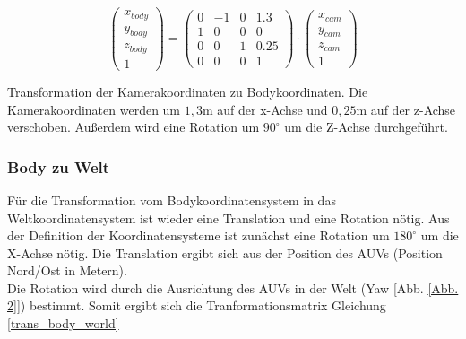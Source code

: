 \begin{ownequation}[H]
\begin{equation}
\begin{pmatrix}
x_{body}\\y_{body}\\z_{body}\\1
\end{pmatrix}
=
\begin{pmatrix}
0 & -1 & 0& 1.3\\
1 & 0 & 0& 0\\
0 & 0 & 1& 0.25\\
0 & 0 & 0 & 1
\end{pmatrix}
\cdot
\begin{pmatrix}
x_{cam}\\y_{cam}\\z_{cam}\\1
\end{pmatrix}
\end{equation}
\caption[Transformation der Kamerakoordinaten zu Bodykoordinaten]{Transformation der Kamerakoordinaten zu Bodykoordinaten. Die Kamerakoordinaten werden um $1,3$m auf der x-Achse und $0,25$m auf der z-Achse verschoben. Außerdem wird eine Rotation um $90^\circ$ um die Z-Achse durchgeführt.}
\label{trans_cam_body}
\end{ownequation}

\subsubsection{Body zu Welt}
Für die Transformation vom Bodykoordinatensystem in das Weltkoordinatensystem ist wieder eine Translation und eine Rotation nötig.
Aus der Definition der Koordinatensysteme ist zunächst eine Rotation um $180^\circ$ um die X-Achse nötig.
Die Translation ergibt sich aus der Position des AUVs (Position Nord/Ost in Metern).\\
Die Rotation wird durch die Ausrichtung des AUVs in der Welt (Yaw [Abb. \ref{Abb. 2}]) bestimmt. Somit ergibt sich die Tranformationsmatrix Gleichung \ref{trans_body_world}\\

